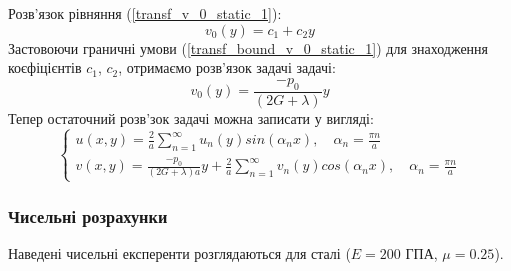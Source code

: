 Розв'язок рівняння (\ref{transf_v_0_static_1}):
\begin{equation}
    v_0(y) = c_1 + c_2 y
\end{equation}
Застовоючи граничні умови (\ref{transf_bound_v_0_static_1}) для знаходження коєфіцієнтів $c_1$, $c_2$, отримаємо розв'язок задачі задачі:
\begin{equation}
    v_0(y) = \frac{-p_0}{(2G + \lambda)}y
\end{equation}
Тепер остаточний розв'зок задачі можна записати у вигляді:
\begin{equation}
    \begin{cases}
        u(x,y) = \frac{2}{a} \sum_{n=1}^{\infty} u_n(y) sin(\alpha_n x), \quad \alpha_n = \frac{\pi n}{a} \\
        v(x,y) = \frac{-p_0}{(2G + \lambda)a}y + \frac{2}{a} \sum_{n=1}^{\infty} v_n(y) cos(\alpha_n x), \quad \alpha_n = \frac{\pi n}{a}
    \end{cases}
\end{equation}

\subsubsection{Чисельні розрахунки}
Наведені чисельні експеренти розглядаються для сталі ($E=200$ ГПА, $\mu=0.25$).

